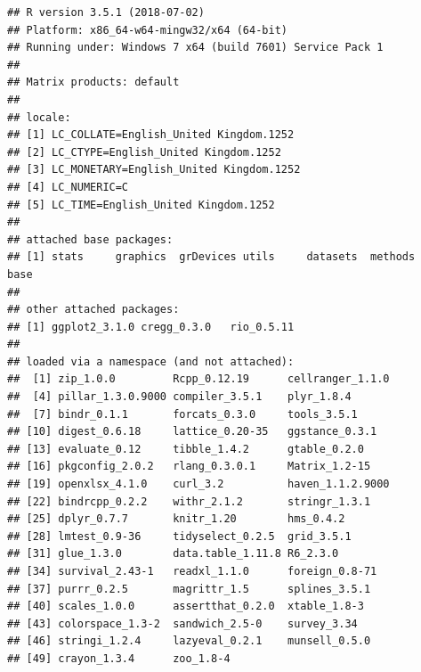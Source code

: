 \documentclass[a4paper,12pt]{article}\usepackage[]{graphicx}\usepackage[]{color}
\makeatletter
\newenvironment{kframe}{%
 \def\at@end@of@kframe{}%
 \ifinner\ifhmode%
  \def\at@end@of@kframe{\end{minipage}}%
  \begin{minipage}{\columnwidth}%
 \fi\fi%
 \def\FrameCommand##1{\hskip\@totalleftmargin \hskip-\fboxsep
 \colorbox{shadecolor}{##1}\hskip-\fboxsep
     \hskip-\linewidth \hskip-\@totalleftmargin \hskip\columnwidth}%
 \MakeFramed {\advance\hsize-\width
   \@totalleftmargin\z@ \linewidth\hsize
   \@setminipage}}%
 {\par\unskip\endMakeFramed%
 \at@end@of@kframe}
\newenvironment{knitrout}{}{} %
\makeatother
\begin{document}
\begin{knitrout}
\color{fgcolor}\begin{kframe}
\begin{verbatim}
## R version 3.5.1 (2018-07-02)
## Platform: x86_64-w64-mingw32/x64 (64-bit)
## Running under: Windows 7 x64 (build 7601) Service Pack 1
## 
## Matrix products: default
## 
## locale:
## [1] LC_COLLATE=English_United Kingdom.1252 
## [2] LC_CTYPE=English_United Kingdom.1252   
## [3] LC_MONETARY=English_United Kingdom.1252
## [4] LC_NUMERIC=C                           
## [5] LC_TIME=English_United Kingdom.1252    
## 
## attached base packages:
## [1] stats     graphics  grDevices utils     datasets  methods   base     
## 
## other attached packages:
## [1] ggplot2_3.1.0 cregg_0.3.0   rio_0.5.11   
## 
## loaded via a namespace (and not attached):
##  [1] zip_1.0.0         Rcpp_0.12.19      cellranger_1.1.0 
##  [4] pillar_1.3.0.9000 compiler_3.5.1    plyr_1.8.4       
##  [7] bindr_0.1.1       forcats_0.3.0     tools_3.5.1      
## [10] digest_0.6.18     lattice_0.20-35   ggstance_0.3.1   
## [13] evaluate_0.12     tibble_1.4.2      gtable_0.2.0     
## [16] pkgconfig_2.0.2   rlang_0.3.0.1     Matrix_1.2-15    
## [19] openxlsx_4.1.0    curl_3.2          haven_1.1.2.9000 
## [22] bindrcpp_0.2.2    withr_2.1.2       stringr_1.3.1    
## [25] dplyr_0.7.7       knitr_1.20        hms_0.4.2        
## [28] lmtest_0.9-36     tidyselect_0.2.5  grid_3.5.1       
## [31] glue_1.3.0        data.table_1.11.8 R6_2.3.0         
## [34] survival_2.43-1   readxl_1.1.0      foreign_0.8-71   
## [37] purrr_0.2.5       magrittr_1.5      splines_3.5.1    
## [40] scales_1.0.0      assertthat_0.2.0  xtable_1.8-3     
## [43] colorspace_1.3-2  sandwich_2.5-0    survey_3.34      
## [46] stringi_1.2.4     lazyeval_0.2.1    munsell_0.5.0    
## [49] crayon_1.3.4      zoo_1.8-4
\end{verbatim}
\end{kframe}
\end{knitrout}
\end{document}
